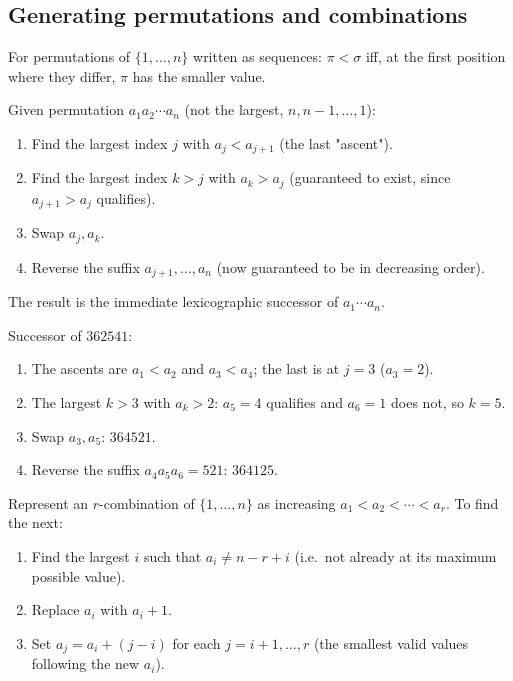 \documentclass[11pt]{article}
\begin{document}
\subsection{Generating permutations and combinations}
\label{sec:8-9-3}

\begin{definition}
For permutations of $\{1,\dots,n\}$ written as sequences: $\pi<\sigma$ iff, at the first position where they differ, $\pi$ has the smaller value.
\end{definition}

\begin{note}
Given permutation $a_1a_2\cdots a_n$ (not the largest, $n,n{-}1,\dots,1$):
\begin{enumerate}[label=\arabic*.]
    \item Find the largest index $j$ with $a_j<a_{j+1}$ (the last "ascent").
    \item Find the largest index $k>j$ with $a_k>a_j$ (guaranteed to exist, since $a_{j+1}>a_j$ qualifies).
    \item Swap $a_j,a_k$.
    \item Reverse the suffix $a_{j+1},\dots,a_n$ (now guaranteed to be in decreasing order).
\end{enumerate}
The result is the immediate lexicographic successor of $a_1\cdots a_n$.
\end{note}

\begin{example}
Successor of $362541$:
\begin{enumerate}[label=\arabic*.]
  \item The ascents are $a_1<a_2$ and $a_3<a_4$; the last is at $j=3$ ($a_3=2$).
  \item The largest $k>3$ with $a_k>2$: $a_5=4$ qualifies and $a_6=1$ does not, so $k=5$.
  \item Swap $a_3,a_5$: $364521$.
  \item Reverse the suffix $a_4a_5a_6=521$: $364125$.
\end{enumerate}
\end{example}

\bigskip
\begin{note}
Represent an $r$-combination of $\{1,\dots,n\}$ as increasing $a_1<a_2<\cdots<a_r$. To find the next:
\begin{enumerate}[label=\arabic*.]
    \item Find the largest $i$ such that $a_i \neq n-r+i$ (i.e.\ not already at its maximum possible value).
    \item Replace $a_i$ with $a_i+1$.
    \item Set $a_j = a_i+(j-i)$ for each $j=i+1,\dots,r$ (the smallest valid values following the new $a_i$).
\end{enumerate}
\end{note}
\end{document}
